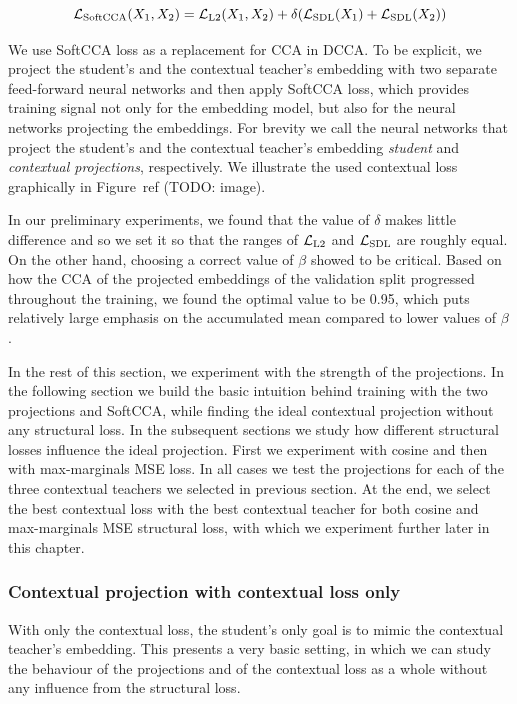 \begin{equation}\label{eq:soft_cca}
  \mathcal{L}_{\text{SoftCCA}}(X_1, X_2) = \mathcal{L}_{\text{L2}}(X_1, X_2) +
      \delta ( \mathcal{L}_{\text{SDL}}(X_1) + \mathcal{L}_{\text{SDL}}(X_2) )
\end{equation}

We use SoftCCA loss as a replacement for CCA in DCCA. To be explicit, we
project the student's and the contextual teacher's embedding with two separate
feed-forward neural networks and then apply SoftCCA loss, which provides
training signal not only for the embedding model, but also for the neural
networks projecting the embeddings. For brevity we call the neural networks
that project the student's and the contextual teacher's embedding
\emph{student} and \emph{contextual projections}, respectively. We illustrate
the used contextual loss graphically in Figure~ref{} (TODO: image).

In our preliminary experiments, we found that the value of $\delta$ makes
little difference and so we set it so that the ranges of $\mathcal{L}_{\text{L2}}$
and $\mathcal{L}_{\text{SDL}}$ are roughly equal. On the other hand, choosing a
correct value of $\beta$ showed to be critical. Based on how the CCA of the
projected embeddings of the validation split progressed throughout the
training, we found the optimal value to be 0.95, which puts relatively large
emphasis on the accumulated mean compared to lower values of $\beta$.

In the rest of this section, we experiment with the strength of the
projections. In the following section we build the basic intuition behind
training with the two projections and SoftCCA, while finding the ideal
contextual projection without any structural loss. In the subsequent sections
we study how different structural losses influence the ideal projection. First
we experiment with cosine and then with max-marginals MSE loss. In all cases we
test the projections for each of the three contextual teachers we selected in
previous section. At the end, we select the best contextual loss with the best
contextual teacher for both cosine and max-marginals MSE structural loss, with
which we experiment further later in this chapter.

\subsubsection{Contextual projection with contextual loss
only}\label{section:projections_only_contextual}

With only the contextual loss, the student's only goal is to mimic the
contextual teacher's embedding. This presents a very basic setting, in which we
can study the behaviour of the projections and of the contextual loss as a
whole without any influence from the structural loss.

